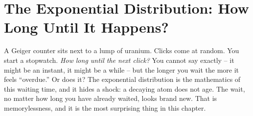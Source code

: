 \section{The Exponential Distribution: How Long Until It Happens?}
\label{ch11:exponential}
\begin{intuitionbox}
A Geiger counter sits next to a lump of uranium. Clicks come at random. You
start a stopwatch. \emph{How long until the next click?} You cannot say exactly
-- it might be an instant, it might be a while -- but the longer you wait the
more it feels ``overdue.'' Or does it? The exponential distribution is the
mathematics of this waiting time, and it hides a shock: a decaying atom does not
age. The wait, no matter how long you have already waited, looks brand new. That
is memorylessness, and it is the most surprising thing in this chapter.
\end{intuitionbox}
